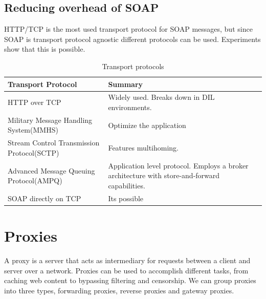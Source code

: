 \documentclass[USenglish]{ifimaster}
\begin{document}
\subsection{Reducing overhead of SOAP}
HTTP/TCP is the most used transport protocol for SOAP messages, but since SOAP is transport protocol agnostic different protocols can be used. Experiments show that this is possible.


\begin{table}[h]
\begin{tabularx}{\textwidth}{| X | X |}
\hline
  \textbf{Transport Protocol} & \textbf{Summary} \\ \hline
  HTTP over TCP & Widely used. Breaks down in DIL environments.\\ \hline
  Military Message Handling System(MMHS) & Optimize the application\\ \hline
  Stream Control Transmission Protocol(SCTP) & Features multihoming. \\ \hline
  Advanced Message Queuing Protocol(AMPQ) & Application level protocol. Employs a broker architecture with store-and-forward capabilities. \\ \hline
  SOAP directly on TCP & Its possible \\ \hline
\end{tabularx}
\caption{Transport protocols}
\end{table}

\section{Proxies}
A proxy is a server that acts as intermediary for requests between a client and server over a network. Proxies can be used to accomplish different tasks, from caching web content to bypassing filtering and censorship. We can group proxies into three types, forwarding proxies, reverse proxies and gateway proxies.
\end{document}
